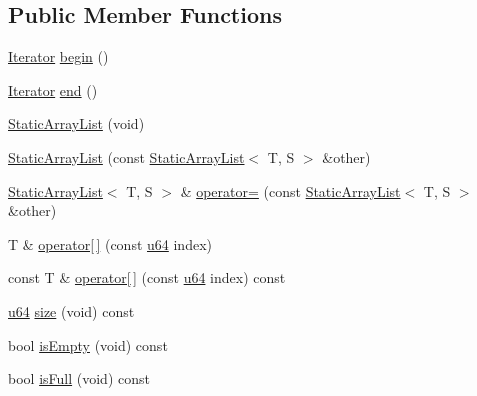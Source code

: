 \subsection*{Public Member Functions}
\begin{DoxyCompactItemize}
\item 
\hyperlink{classcrap_1_1container_1_1_static_array_list_1_1_iterator}{Iterator} \hyperlink{classcrap_1_1container_1_1_static_array_list_a813e49a48fddb39e7faa69313ff5ddc6}{begin} ()
\item 
\hyperlink{classcrap_1_1container_1_1_static_array_list_1_1_iterator}{Iterator} \hyperlink{classcrap_1_1container_1_1_static_array_list_a490fc6db4a0803c89e087e65ad6bf354}{end} ()
\item 
\hyperlink{classcrap_1_1container_1_1_static_array_list_aab56dada491e765702daa04bae4db737}{Static\-Array\-List} (void)
\item 
\hyperlink{classcrap_1_1container_1_1_static_array_list_a6f53cddaef53bb7e85c878430f9d9c76}{Static\-Array\-List} (const \hyperlink{classcrap_1_1container_1_1_static_array_list}{Static\-Array\-List}$<$ T, S $>$ \&other)
\item 
\hyperlink{classcrap_1_1container_1_1_static_array_list}{Static\-Array\-List}$<$ T, S $>$ \& \hyperlink{classcrap_1_1container_1_1_static_array_list_a1777a64586945ef06f45718a453c1398}{operator=} (const \hyperlink{classcrap_1_1container_1_1_static_array_list}{Static\-Array\-List}$<$ T, S $>$ \&other)
\item 
T \& \hyperlink{classcrap_1_1container_1_1_static_array_list_a8af4e02d18c9d92be8f5815a67644f7e}{operator\mbox{[}$\,$\mbox{]}} (const \hyperlink{types_8h_a3f7e2bcbb0b4c338f3c4f6c937cd4234}{u64} index)
\item 
const T \& \hyperlink{classcrap_1_1container_1_1_static_array_list_a12392eb67291016b852954bea6d5abb2}{operator\mbox{[}$\,$\mbox{]}} (const \hyperlink{types_8h_a3f7e2bcbb0b4c338f3c4f6c937cd4234}{u64} index) const 
\item 
\hyperlink{types_8h_a3f7e2bcbb0b4c338f3c4f6c937cd4234}{u64} \hyperlink{classcrap_1_1container_1_1_static_array_list_aaa731da50408dba62c5d4ecff7fd842f}{size} (void) const 
\item 
bool \hyperlink{classcrap_1_1container_1_1_static_array_list_a6da9ea06e8c246a0b002fc986aceb98d}{is\-Empty} (void) const 
\item 
bool \hyperlink{classcrap_1_1container_1_1_static_array_list_aebb866bc8349b5a0d02b6aa9f36be05d}{is\-Full} (void) const 
\item 

\end{DoxyCompactItemize}
